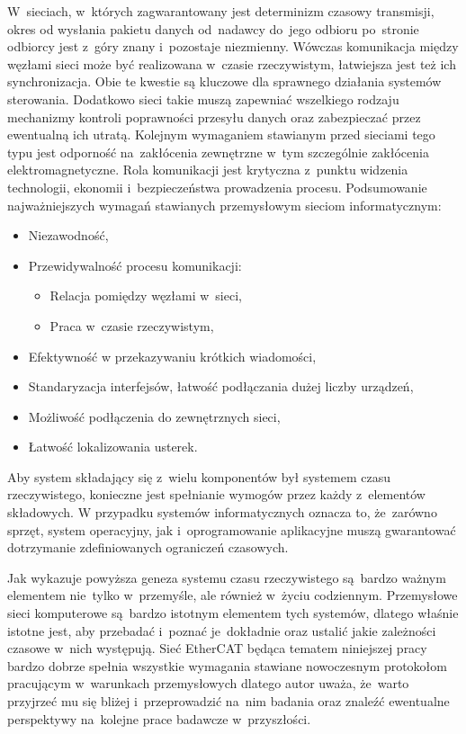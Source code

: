W~sieciach, w~których zagwarantowany jest determinizm czasowy transmisji, okres od wysłania pakietu danych od~nadawcy do~jego odbioru po~stronie odbiorcy jest z~góry znany i~pozostaje niezmienny. Wówczas komunikacja między węzłami sieci może być realizowana w~czasie rzeczywistym, łatwiejsza jest też ich synchronizacja. Obie te kwestie są kluczowe dla sprawnego działania systemów sterowania. Dodatkowo sieci takie muszą zapewniać wszelkiego rodzaju mechanizmy kontroli poprawności przesyłu danych oraz zabezpieczać przez ewentualną ich utratą. Kolejnym wymaganiem stawianym przed sieciami tego typu jest odporność na~zakłócenia zewnętrzne w~tym szczególnie zakłócenia elektromagnetyczne. Rola komunikacji jest krytyczna z~punktu widzenia technologii, ekonomii i~bezpieczeństwa prowadzenia procesu.
Podsumowanie najważniejszych wymagań stawianych przemysłowym sieciom informatycznym:
\begin{itemize}
\item Niezawodność,
\item Przewidywalność procesu komunikacji:
\begin{itemize}
\item Relacja pomiędzy węzłami w~sieci,
\item Praca w~czasie rzeczywistym,
\end{itemize}
\item Efektywność w przekazywaniu krótkich wiadomości,
\item Standaryzacja interfejsów, łatwość podłączania dużej liczby urządzeń,
\item Możliwość podłączenia do zewnętrznych sieci,
\item Łatwość lokalizowania usterek.
\end{itemize}

Aby system składający się z~wielu komponentów był systemem czasu rzeczywistego, konieczne jest spełnianie wymogów przez każdy z~elementów składowych. W przypadku systemów informatycznych oznacza to, że~zarówno sprzęt, system operacyjny, jak i~oprogramowanie aplikacyjne muszą gwarantować dotrzymanie zdefiniowanych ograniczeń czasowych.

Jak wykazuje powyższa geneza systemu czasu rzeczywistego są~bardzo ważnym elementem nie~tylko w~przemyśle, ale również w~życiu codziennym. Przemysłowe sieci komputerowe są~bardzo istotnym elementem tych systemów, dlatego właśnie istotne jest, aby przebadać i~poznać je~dokładnie oraz ustalić jakie zależności czasowe w~nich występują.
Sieć EtherCAT będąca tematem niniejszej pracy bardzo dobrze spełnia wszystkie wymagania stawiane nowoczesnym protokołom pracującym w~warunkach przemysłowych dlatego autor uważa, że~warto przyjrzeć mu się bliżej i~przeprowadzić na~nim badania oraz znaleźć ewentualne perspektywy na~kolejne prace badawcze w~przyszłości.

